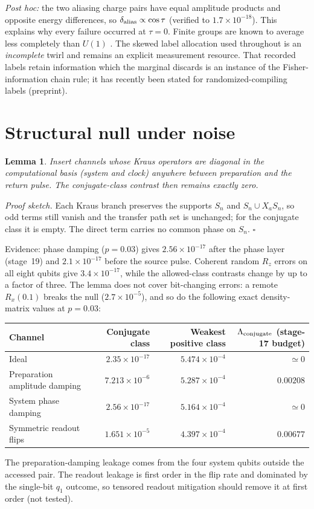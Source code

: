 \documentclass[11pt,a4paper]{article}
\newtheorem*{lemma}{Lemma}
\begin{document}
\emph{Post hoc:} the two aliasing charge pairs have equal amplitude products and opposite energy differences, so $\delta_{\rm alias}\propto\cos\tau$ (verified to $1.7\times10^{-18}$). This explains why every failure occurred at $\tau=0$. Finite groups are known to average less completely than $U(1)$ \cite{tran2021}. The skewed label allocation used throughout is an \emph{incomplete} twirl and remains an explicit measurement resource. That recorded labels retain information which the marginal discards is an instance of the Fisher-information chain rule; it has recently been stated for randomized-compiling labels \cite{vyas2026} (preprint).

\section*{Structural null under noise}
\begin{lemma}
Insert channels whose Kraus operators are diagonal in the computational basis (system and clock) anywhere between preparation and the return pulse. The conjugate-class contrast then remains exactly zero.
\end{lemma}
\emph{Proof sketch.} Each Kraus branch preserves the supports $S_n$ and $S_n\cup X_aS_n$, so odd terms still vanish and the transfer path set is unchanged; for the conjugate class it is empty. The direct term carries no common phase on $S_n$. \hfill$\square$

Evidence: phase damping ($p=0.03$) gives $2.56\times10^{-17}$ after the phase layer (stage~19) and $2.1\times10^{-17}$ before the source pulse. Coherent random $R_z$ errors on all eight qubits give $3.4\times10^{-17}$, while the allowed-class contrasts change by up to a factor of three. The lemma does not cover bit-changing errors: a remote $R_x(0.1)$ breaks the null ($2.7\times10^{-5}$), and so do the following exact density-matrix values at $p=0.03$:
\begin{center}\small
\begin{tabular}{@{}l r r r@{}}
\toprule
Channel & Conjugate class & Weakest positive class & $\Lambda_{\rm conjugate}$ (stage-17 budget)\\
\midrule
Ideal & $2.35\times10^{-17}$ & $5.474\times10^{-4}$ & $\simeq0$\\
Preparation amplitude damping & $7.213\times10^{-6}$ & $5.287\times10^{-4}$ & $0.00208$\\
System phase damping & $2.56\times10^{-17}$ & $5.164\times10^{-4}$ & $\simeq0$\\
Symmetric readout flips & $1.651\times10^{-5}$ & $4.397\times10^{-4}$ & $0.00677$\\
\bottomrule
\end{tabular}
\end{center}
The preparation-damping leakage comes from the four system qubits outside the accessed pair. The readout leakage is first order in the flip rate and dominated by the single-bit $q_1$ outcome, so tensored readout mitigation \cite{bravyi2021} should remove it at first order (not tested).
\end{document}
